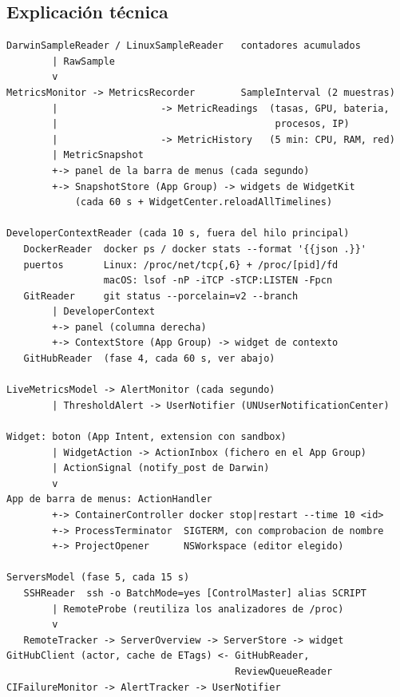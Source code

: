 \documentclass[11pt,a4paper]{article}
\begin{document}
\subsection{Explicación técnica}
\begin{lstlisting}
DarwinSampleReader / LinuxSampleReader   contadores acumulados
        | RawSample
        v
MetricsMonitor -> MetricsRecorder        SampleInterval (2 muestras)
        |                  -> MetricReadings  (tasas, GPU, bateria,
        |                                      procesos, IP)
        |                  -> MetricHistory   (5 min: CPU, RAM, red)
        | MetricSnapshot
        +-> panel de la barra de menus (cada segundo)
        +-> SnapshotStore (App Group) -> widgets de WidgetKit
            (cada 60 s + WidgetCenter.reloadAllTimelines)

DeveloperContextReader (cada 10 s, fuera del hilo principal)
   DockerReader  docker ps / docker stats --format '{{json .}}'
   puertos       Linux: /proc/net/tcp{,6} + /proc/[pid]/fd
                 macOS: lsof -nP -iTCP -sTCP:LISTEN -Fpcn
   GitReader     git status --porcelain=v2 --branch
        | DeveloperContext
        +-> panel (columna derecha)
        +-> ContextStore (App Group) -> widget de contexto
   GitHubReader  (fase 4, cada 60 s, ver abajo)

LiveMetricsModel -> AlertMonitor (cada segundo)
        | ThresholdAlert -> UserNotifier (UNUserNotificationCenter)

Widget: boton (App Intent, extension con sandbox)
        | WidgetAction -> ActionInbox (fichero en el App Group)
        | ActionSignal (notify_post de Darwin)
        v
App de barra de menus: ActionHandler
        +-> ContainerController docker stop|restart --time 10 <id>
        +-> ProcessTerminator  SIGTERM, con comprobacion de nombre
        +-> ProjectOpener      NSWorkspace (editor elegido)

ServersModel (fase 5, cada 15 s)
   SSHReader  ssh -o BatchMode=yes [ControlMaster] alias SCRIPT
        | RemoteProbe (reutiliza los analizadores de /proc)
        v
   RemoteTracker -> ServerOverview -> ServerStore -> widget
GitHubClient (actor, cache de ETags) <- GitHubReader,
                                        ReviewQueueReader
CIFailureMonitor -> AlertTracker -> UserNotifier
\end{lstlisting}
\end{document}

